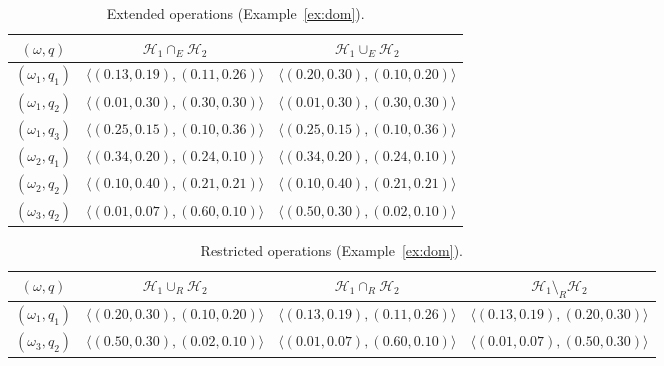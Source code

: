\begin{table}[htbp]
\caption{Extended operations (Example~\ref{ex:dom}).}\label{tab:domout}
\centering\small
\begin{tabular}{@{}ccc@{}}
\toprule
$(\omega,q)$ & $\mathcal{H}_1\cap_{E}\mathcal{H}_2$ & $\mathcal{H}_1\cup_{E}\mathcal{H}_2$ \\
\midrule
$(\omega_{1},q_{1})$ & $\langle(0.13,0.19),(0.11,0.26)\rangle$ & $\langle(0.20,0.30),(0.10,0.20)\rangle$ \\
$(\omega_{1},q_{2})$ & $\langle(0.01,0.30),(0.30,0.30)\rangle$ & $\langle(0.01,0.30),(0.30,0.30)\rangle$ \\
$(\omega_{1},q_{3})$ & $\langle(0.25,0.15),(0.10,0.36)\rangle$ & $\langle(0.25,0.15),(0.10,0.36)\rangle$ \\
$(\omega_{2},q_{1})$ & $\langle(0.34,0.20),(0.24,0.10)\rangle$ & $\langle(0.34,0.20),(0.24,0.10)\rangle$ \\
$(\omega_{2},q_{2})$ & $\langle(0.10,0.40),(0.21,0.21)\rangle$ & $\langle(0.10,0.40),(0.21,0.21)\rangle$ \\
$(\omega_{3},q_{2})$ & $\langle(0.01,0.07),(0.60,0.10)\rangle$ & $\langle(0.50,0.30),(0.02,0.10)\rangle$ \\
\bottomrule
\end{tabular}
\end{table}

\begin{table}[htbp]
\caption{Restricted operations (Example~\ref{ex:dom}).}\label{tab:domoutR}
\centering\small
\begin{tabular}{@{}cccc@{}}
\toprule
$(\omega,q)$ & $\mathcal{H}_1\cup_{R}\mathcal{H}_2$ & $\mathcal{H}_1\cap_{R}\mathcal{H}_2$ & $\mathcal{H}_1\setminus_{R}\mathcal{H}_2$ \\
\midrule
$(\omega_{1},q_{1})$ & $\langle(0.20,0.30),(0.10,0.20)\rangle$ & $\langle(0.13,0.19),(0.11,0.26)\rangle$ & $\langle(0.13,0.19),(0.20,0.30)\rangle$ \\
$(\omega_{3},q_{2})$ & $\langle(0.50,0.30),(0.02,0.10)\rangle$ & $\langle(0.01,0.07),(0.60,0.10)\rangle$ & $\langle(0.01,0.07),(0.50,0.30)\rangle$ \\
\bottomrule
\end{tabular}
\end{table}
